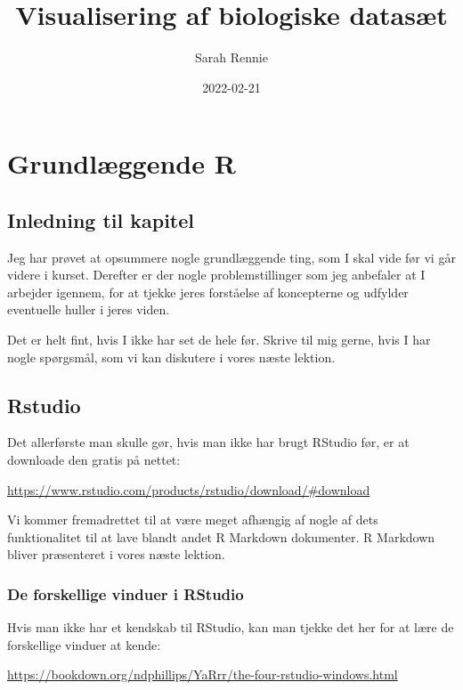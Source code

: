 \documentclass[
]{book}
\title{Visualisering af biologiske datasæt}
\author{Sarah Rennie}
\date{2022-02-21}
\begin{document}
\maketitle

{
\setcounter{tocdepth}{1}
\tableofcontents
}
\hypertarget{basics}{%
\chapter{Grundlæggende R}\label{basics}}

\hypertarget{inledning-til-kapitel}{%
\section{Inledning til kapitel}\label{inledning-til-kapitel}}

Jeg har prøvet at opsummere nogle grundlæggende ting, som I skal vide før vi går videre i kurset. Derefter er der nogle problemstillinger som jeg anbefaler at I arbejder igennem, for at tjekke jeres forståelse af koncepterne og udfylder eventuelle huller i jeres viden.

Det er helt fint, hvis I ikke har set de hele før. Skrive til mig gerne, hvis I har nogle spørgsmål, som vi kan diskutere i vores næste lektion.

\hypertarget{rstudio}{%
\section{Rstudio}\label{rstudio}}

Det allerførste man skulle gør, hvis man ikke har brugt RStudio før, er at downloade den gratis på nettet:

\url{https://www.rstudio.com/products/rstudio/download/\#download}

Vi kommer fremadrettet til at være meget afhængig af nogle af dets funktionalitet til at lave blandt andet R Markdown dokumenter. R Markdown bliver præsenteret i vores næste lektion.

\hypertarget{de-forskellige-vinduer-i-rstudio}{%
\subsection{De forskellige vinduer i RStudio}\label{de-forskellige-vinduer-i-rstudio}}

Hvis man ikke har et kendskab til RStudio, kan man tjekke det her for at lære de forskellige vinduer at kende:

\url{https://bookdown.org/ndphillips/YaRrr/the-four-rstudio-windows.html}
\end{document}
